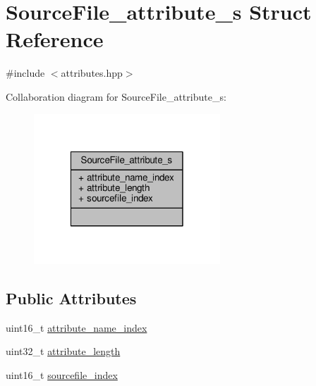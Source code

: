\hypertarget{structSourceFile__attribute__s}{\section{Source\+File\+\_\+attribute\+\_\+s Struct Reference}
\label{structSourceFile__attribute__s}
}


{\ttfamily \#include $<$attributes.\+hpp$>$}



Collaboration diagram for Source\+File\+\_\+attribute\+\_\+s\+:\nopagebreak
\begin{figure}[H]
\begin{center}
\leavevmode
\includegraphics[width=198pt]{structSourceFile__attribute__s__coll__graph}
\end{center}
\end{figure}
\subsection*{Public Attributes}
\begin{DoxyCompactItemize}
\item 
uint16\+\_\+t \hyperlink{structSourceFile__attribute__s_af373e87d77acccb3b69b491062fa12ea}{attribute\+\_\+name\+\_\+index}
\item 
uint32\+\_\+t \hyperlink{structSourceFile__attribute__s_a3aad253479910514937e30e6874c37cd}{attribute\+\_\+length}
\item 
uint16\+\_\+t \hyperlink{structSourceFile__attribute__s_a58a666cf2e0ffd0557d6edc270bf195f}{sourcefile\+\_\+index}
\end{DoxyCompactItemize}


